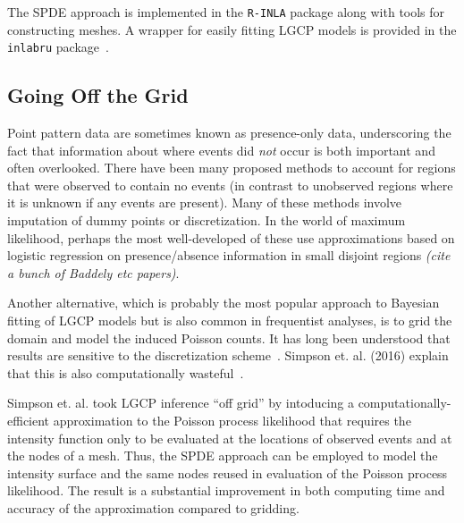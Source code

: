 \documentclass[]{interact}
\begin{document}
The SPDE approach is implemented in the \texttt{R-INLA} package along with
tools for constructing meshes. A wrapper for easily fitting LGCP models is
provided in the \texttt{inlabru} package~\cite{inlabru}.


\subsection{Going Off the Grid}
\label{offgrid}

Point pattern data are sometimes known as presence-only data, underscoring
the fact that information about where events did \emph{not} occur is both
important and often overlooked. There have been many proposed methods to
account for regions that were observed to contain no events (in contrast to
unobserved regions where it is unknown if any events are present). Many of
these methods involve imputation of dummy points or discretization. In the
world of maximum likelihood, perhaps the most well-developed of these use
approximations based on logistic regression on presence/absence information in
small disjoint regions {\it (cite a bunch of Baddely etc papers)}.

Another alternative, which is probably the most popular approach to Bayesian
fitting of LGCP models but is also common in frequentist analyses, is to grid
the domain and model the induced Poisson counts. It has long been understood
that results are sensitive to the discretization scheme~\cite{brixmoeller}.
Simpson et. al. (2016) explain that this is also computationally
wasteful~\cite{simpsonetal}.

Simpson et. al. took LGCP inference ``off grid'' by intoducing a
computationally-efficient approximation to the Poisson process likelihood that
requires the intensity function only to be evaluated at the locations of
observed events and at the nodes of a mesh. Thus, the SPDE approach can be
employed to model the intensity surface and the same nodes reused in
evaluation of the Poisson process likelihood. The result is a substantial
improvement in both computing time and accuracy of the approximation compared
to gridding.

\end{document}
